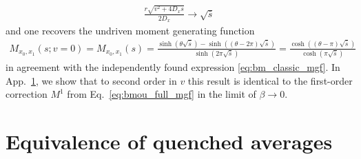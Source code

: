 \documentclass[%
 reprint,
superscriptaddress,
nofootinbib,
 amsmath,amssymb,
 aps,
prx,
]{revtex4-2}
\begin{document}
\begin{widetext}
\begin{align}
	\frac{r \sqrt{v^2 + 4 D_x s}}{2D_{x}} \to \sqrt{\bar{s}}
	\label{}
\end{align}
and one recovers the undriven moment generating function 
\begin{align}
		M_{x_0, x_1}( s; v=0) =M_{x_0, x_1 }( s) = \frac{\sinh\left( \theta \sqrt{\bar{s}} \right) - \sinh\left( (\theta - 2 \pi) \sqrt{\bar{s}} \right)}{\sinh\left( 2\pi \sqrt{\bar{s}} \right)}= \frac{\cosh\left( (\theta - \pi)\sqrt{\bar{s}} \right)}{\cosh\left( \pi \sqrt{\bar{s}} \right)}
	\label{}
\end{align}
in agreement with the independently found expression \eqref{eq:bm_classic_mgf}. In App.~\ref{app:equivalent_quenched_averages}, we show that to second order in $v$ this result is identical to the first-order correction $M^1$ from Eq.~\eqref{eq:bmou_full_mgf} in the limit of $\beta \to 0$.

\section{Equivalence of quenched averages}
\label{app:equivalent_quenched_averages}


\end{widetext}
\end{document}
